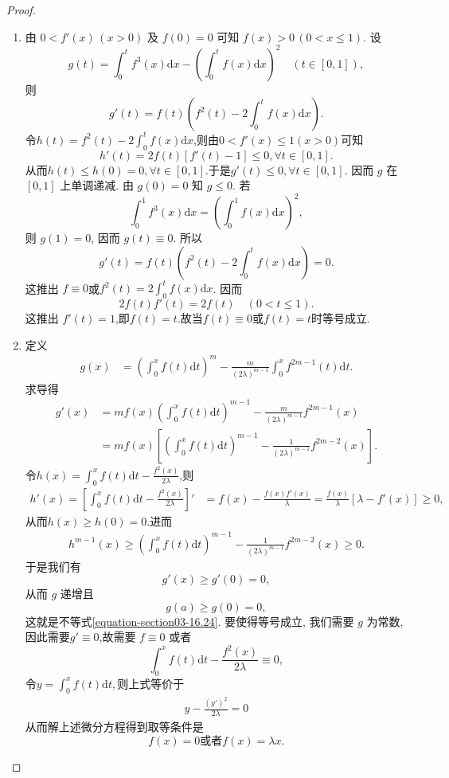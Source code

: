 \documentclass[../../main.tex]{subfiles}
\begin{document}
\begin{proof}
\begin{enumerate}
\item 由 $0<f'(x)\,(x>0)$ 及 $f(0)=0$ 可知 $f(x)>0\,(0<x\leqslant 1)$. 设
$$g(t)=\int_0^t f^3(x)\mathrm{d}x-\left(\int_0^t f(x)\mathrm{d}x\right)^2\quad(t\in[0,1]),$$
则
$$g'(t)=f(t)\left(f^2(t)-2\int_0^t f(x)\mathrm{d}x\right).$$
令$h(t)=f^2(t)-2\int_0^t f(x)\mathrm{d}x$,则由$0<f'(x)\leqslant 1(x>0)$可知
\[
h' \left( t \right) =2f\left( t \right) \left[ f' \left( t \right) -1 \right] \leqslant 0,\forall t\in \left[ 0,1 \right] .
\]
从而$h(t)\leqslant h(0)=0,\forall t\in \left[ 0,1 \right] $.于是$g'(t)\leqslant 0,\forall t\in \left[ 0,1 \right]$.
因而 $g$ 在 $[0,1]$ 上单调递减. 由 $g(0)=0$ 知 $g\leqslant 0$. 若
$$\int_0^1 f^3(x)\mathrm{d}x=\left(\int_0^1 f(x)\mathrm{d}x\right)^2,$$
则 $g(1)=0$, 因而 $g(t)\equiv0$. 所以
$$g'(t)=f(t)\left(f^2(t)-2\int_0^t f(x)\mathrm{d}x\right)=0.$$
这推出 $f\equiv 0$或$f^2(t)=2\int_0^t f(x)\mathrm{d}x$. 因而
$$2f(t)f'(t)=2f(t)\quad(0<t\leqslant 1).$$
这推出 $f'(t)=1$,即$f(t)=t$.故当$f(t)\equiv 0$或$f(t)=t$时等号成立.

\item 定义
\begin{align*}
g(x) &= \left(\int_{0}^{x}f(t)\mathrm{d}t\right)^m - \frac{m}{(2\lambda)^{m - 1}}\int_{0}^{x}f^{2m - 1}(t)\mathrm{d}t.
\end{align*}
求导得
\begin{align*}
g'(x) &= mf(x)\left(\int_{0}^{x}f(t)\mathrm{d}t\right)^{m - 1} - \frac{m}{(2\lambda)^{m - 1}}f^{2m - 1}(x)\\
&= mf(x)\left[\left(\int_{0}^{x}f(t)\mathrm{d}t\right)^{m - 1} - \frac{1}{(2\lambda)^{m - 1}}f^{2m - 2}(x)\right].
\end{align*}
令$h(x)=\int_{0}^{x}f(t)\mathrm{d}t - \frac{f^2(x)}{2\lambda}$,则
\begin{align*}
h'(x)=\left[\int_{0}^{x}f(t)\mathrm{d}t - \frac{f^2(x)}{2\lambda}\right]' &= f(x) - \frac{f(x)f'(x)}{\lambda} = \frac{f(x)}{\lambda}[\lambda - f'(x)] \geqslant 0,
\end{align*}
从而$h(x)\geqslant  h(0)=0.$进而
\begin{align*}
h^{m-1}(x)\geqslant \left(\int_{0}^{x}f(t)\mathrm{d}t\right)^{m - 1} - \frac{1}{(2\lambda)^{m - 1}}f^{2m - 2}(x)\geqslant 0.
\end{align*}
于是我们有
\[g'(x) \geqslant g'(0) = 0,\]
从而 $g$ 递增且
\[g(a) \geqslant g(0) = 0,\]
这就是不等式\eqref{equation-section03-16.24}.
要使得等号成立, 我们需要 $g$ 为常数, 因此需要$g'\equiv 0$,故需要 $f \equiv 0$ 或者
\[\int_{0}^{x}f(t)\mathrm{d}t - \frac{f^2(x)}{2\lambda} \equiv 0,\]
令$y=\int_{0}^{x}f(t)\mathrm{d}t,$则上式等价于
\begin{align*}
y-\frac{(y')^2}{2\lambda}=0
\end{align*}
从而解上述微分方程得到取等条件是
\[f(x) = 0\text{或者}f(x) = \lambda x.\]
\end{enumerate}
\end{proof}
\end{document}
